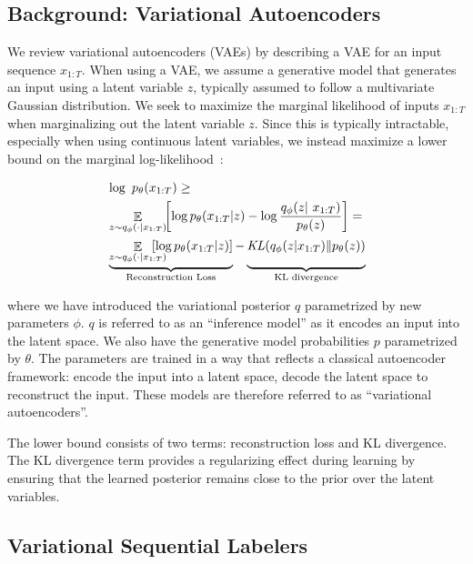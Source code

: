 \documentclass[11pt,a4paper]{article}
\newcommand{\kld}{\mathit{KL}}
\begin{document}
\subsection{Background: Variational Autoencoders}
We review variational autoencoders (VAEs) by  describing a VAE for an input sequence $x_{1:T}$. When using a VAE, we assume a generative model that generates an input using a latent variable $z$, typically assumed to follow a multivariate Gaussian distribution. We seek to maximize the marginal likelihood of inputs $x_{1:T}$ when marginalizing out the latent variable $z$. Since this is typically intractable, especially when using continuous latent variables, we instead maximize a lower bound on the marginal log-likelihood~\citep{kingma2013auto}:

\begin{equation}
\begin{aligned}
    &\log~p_\theta(x_{1:T})\geq\\
    &\mathop\mathbb{E}_{z\sim q_\phi(\cdot\vert x_{1:T})}\!\!\left[\log p_\theta(x_{1:T}\vert z)-\log\frac{q_\phi(z\vert~x_{1:T})}{p_\theta(z)} \right]=\\
    &\underbrace{\mathop\mathbb{E}_{z\sim q_\phi(\cdot\vert x_{1:T})}\!\!\!\!\!\!\!\!\left[\log p_\theta(x_{1:T}\vert z)\right]}_\text{Reconstruction Loss}-\underbrace{\vphantom{\mathop\mathbb{E}_{z\sim~q_\phi(\cdot\vert x_{1:T})}\left[\log p_\theta(x_{1:T}\vert z)\right]}\kld(q_\phi(z\vert x_{1:T})\Vert p_\theta(z))}_\text{KL divergence}
\end{aligned}
\label{eq:vae_elbo}
\end{equation}

\noindent where we have introduced the variational posterior $q$ parametrized by new parameters $\phi$. $q$ is referred to as an ``inference model'' as it encodes an input into the latent space. We also have the generative model probabilities $p$ parametrized by $\theta$. The parameters are trained in a way that reflects a classical autoencoder framework: encode the input into a latent space, decode the latent space to reconstruct the input. These models are therefore referred to as ``variational autoencoders''.

The lower bound consists of two terms: reconstruction loss and KL divergence.
The KL divergence term provides a regularizing effect during learning by ensuring that the learned posterior remains close to the prior over the latent variables.

\subsection{Variational Sequential Labelers}
\end{document}
